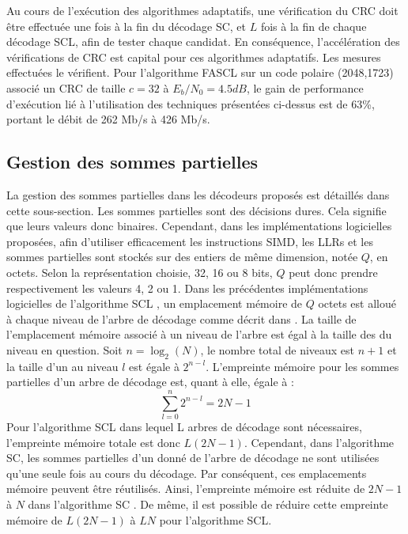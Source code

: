Au cours de l'exécution des algorithmes adaptatifs, une vérification du CRC doit être effectuée une fois à la fin du décodage SC, et $L$ fois à la fin de chaque décodage SCL, afin de tester chaque candidat. En conséquence, l'accélération des vérifications de CRC est capital pour ces algorithmes adaptatifs.
Les mesures effectuées le vérifient. Pour l'algorithme FASCL sur un code polaire (2048,1723) associé un CRC de taille $c=32$ à $E_b/N_0 = 4.5dB$, le gain de performance d'exécution lié à l'utilisation des techniques présentées ci-dessus est de 63\%, portant le débit de 262 Mb/s à 426 Mb/s.

\subsection{Gestion des sommes partielles}
La gestion des sommes partielles dans les décodeurs proposés est détaillés dans cette sous-section.
Les sommes partielles sont des décisions dures. Cela signifie que leurs valeurs donc binaires. Cependant, dans les implémentations logicielles proposées, afin d'utiliser efficacement les instructions SIMD, les LLRs et les sommes partielles sont stockés sur des entiers de même dimension, notée $Q$, en octets. Selon la représentation choisie, 32, 16 ou 8 bits, $Q$ peut donc prendre respectivement les valeurs 4, 2 ou 1. 
Dans les précédentes implémentations logicielles de l'algorithme SCL \cite{sarkis_fast_2016,sarkis_increasing_2014,shen_low-latency_2016}, un emplacement mémoire de $Q$ octets est alloué à chaque niveau de l'arbre de décodage comme décrit dans \cite{tal_list_2011}. La taille de l'emplacement mémoire associé à un niveau de l'arbre est égal à la taille des \noeuds du niveau en question. Soit $n=\log_2(N)$, le nombre total de niveaux est $n+1$ et la taille d'un \noeud au niveau $l$ est égale à $2^{n-l}$. L'empreinte mémoire pour les sommes partielles d'un arbre de décodage est, quant à elle, égale à : 
\begin{equation}
\sum^n_{l=0}2^{n-l}=2N-1
\end{equation}
Pour l'algorithme SCL dans lequel L arbres de décodage sont nécessaires, l'empreinte mémoire totale est donc $L(2N-1)$. Cependant, dans l'algorithme SC, les sommes partielles d'un \noeud donné de l'arbre de décodage ne sont utilisées qu'une seule fois au cours du décodage. Par conséquent, ces emplacements mémoire peuvent être réutilisés. Ainsi, l'empreinte mémoire est réduite de $2N-1$ à $N$ dans l'algorithme SC \cite{leroux_hardware_2011}. De même, il est possible de réduire cette empreinte mémoire de $L(2N-1)$ à $LN$ pour l'algorithme SCL.

